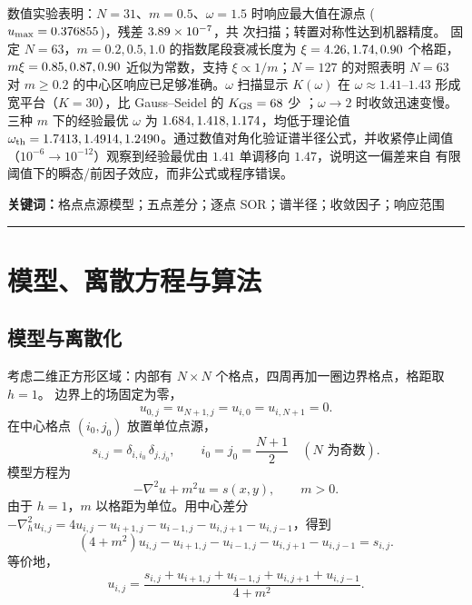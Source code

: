 \documentclass[UTF8,fontset=windows,a4paper,11pt]{ctexart}
\begin{document}
数值实验表明：$N=31$、$m=0.5$、$\omega=1.5$ 时响应最大值在源点
($u_{\max}=0.376855$)，残差 $3.89\times10^{-7}$，共 \KtaskI{} 次扫描；转置对称性达到机器精度。
固定 $N=63$，$m=0.2,0.5,1.0$ 的指数尾段衰减长度为 $\xi=4.26,1.74,0.90$ 个格距，
$m\xi=0.85,0.87,0.90$ 近似为常数，支持 $\xi\propto1/m$；$N=127$ 的对照表明 $N=63$
对 $m\ge0.2$ 的中心区响应已足够准确。$\omega$ 扫描显示 $K(\omega)$ 在
$\omega\approx1.41$--$1.43$ 形成宽平台（$K=30$），比 Gauss--Seidel 的
$K_{\rm GS}=68$ 少 \RedThree；$\omega\to2$ 时收敛迅速变慢。三种 $m$ 下的经验最优
$\omega$ 为 $1.684,1.418,1.174$，均低于理论值
$\omega_{\rm th}=1.7413,1.4914,1.2490$。通过数值对角化验证谱半径公式，并收紧停止阈值
（$10^{-6}\to10^{-12}$）观察到经验最优由 $1.41$ 单调移向 $1.47$，说明这一偏差来自
有限阈值下的瞬态/前因子效应，而非公式或程序错误。

\vspace{0.8em}
\noindent\textbf{关键词：}格点点源模型；五点差分；逐点 SOR；谱半径；收敛因子；响应范围

\vspace{1.0em}
\noindent\rule{\linewidth}{0.4pt}

\section{模型、离散方程与算法}

\subsection{模型与离散化}

考虑二维正方形区域：内部有 $N\times N$ 个格点，四周再加一圈边界格点，格距取 $h=1$。
边界上的场固定为零，
\begin{equation}
u_{0,j}=u_{N+1,j}=u_{i,0}=u_{i,N+1}=0 .
\label{eq:bc}
\end{equation}
在中心格点 $(i_0,j_0)$ 放置单位点源，
\begin{equation}
s_{i,j}=\delta_{i,i_0}\,\delta_{j,j_0},
\qquad
i_0=j_0=\frac{N+1}{2}\quad(N\text{ 为奇数}).
\label{eq:source}
\end{equation}
模型方程为
\begin{equation}
-\nabla^2u+m^2u=s(x,y),
\qquad m>0 .
\label{eq:model}
\end{equation}
由于 $h=1$，$m$ 以格距为单位。用中心差分
$-\nabla_h^2u_{i,j}=4u_{i,j}-u_{i+1,j}-u_{i-1,j}-u_{i,j+1}-u_{i,j-1}$，得到
\begin{equation}
(4+m^2)u_{i,j}-u_{i+1,j}-u_{i-1,j}-u_{i,j+1}-u_{i,j-1}=s_{i,j}.
\label{eq:discrete}
\end{equation}
等价地，
\begin{equation}
u_{i,j}=\frac{s_{i,j}+u_{i+1,j}+u_{i-1,j}+u_{i,j+1}+u_{i,j-1}}{4+m^2}.
\label{eq:gsform}
\end{equation}
\end{document}
